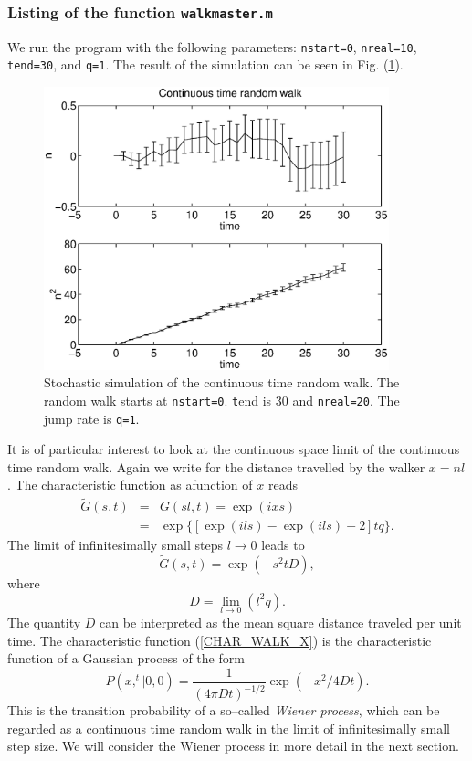 \subsubsection{Listing of the function \texttt{walkmaster.m}}

We run the program with the following parameters: 
\texttt{nstart=0}, \texttt{nreal=10}, \texttt{tend=30}, and
\texttt{q=1}. The result of the simulation can be seen in
Fig. (\ref{F_CTRW}).
\begin{figure}
\label{F_CTRW}
\includegraphics[width=10cm]{./Figures/f_ctrw.eps}
\caption{Stochastic simulation of the continuous time
random walk. The 
random walk starts at \texttt{nstart=0}.  
{\texttt tend} is 30 and \texttt{nreal=20}.
The jump rate is \texttt{q=1}.}
\end{figure}

It is of particular interest to look at the continuous space limit
of the continuous time random walk. Again we write for the 
distance travelled by the walker $x=nl$. The characteristic
function as afunction of $x$ reads
\begin{eqnarray*}
\tilde{G}(s,t) &=& G(sl,t) = \exp(ixs) \\
                &=& \exp\{[\exp(ils)-\exp(ils)-2]tq \}.
\end{eqnarray*}
The limit of infinitesimally small steps $l \longrightarrow 0$ 
leads to
\begin{equation}
\label{CHAR_WALK_X}
\tilde{G}(s,t) = \exp(-s^2tD),
\end{equation}
where
\begin{equation*}
D=\lim_{l\rightarrow 0} (l^2q).
\end{equation*}
The quantity $D$ can be interpreted as the mean square distance 
traveled  per unit time.  The characteristic function (\ref{CHAR_WALK_X})
is the characteristic function of a Gaussian process of the form
\begin{equation*}
P(x,^t|0,0) = \frac{1}{(4\pi Dt)^{-1/2}} \exp\left( -x^2/4Dt 
\right).
\end{equation*}
This is the transition probability of a so--called {\em Wiener process},
which can be regarded as a continuous time random walk in the 
limit of infinitesimally small step size. We will consider the 
Wiener process in more detail in the next section.

